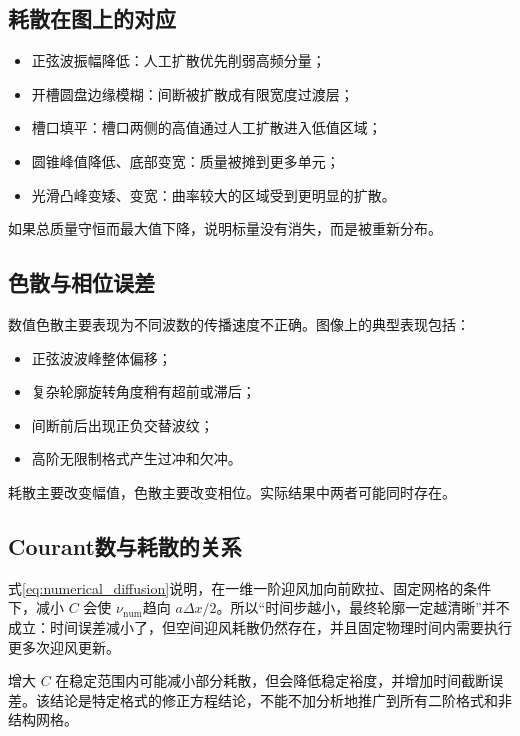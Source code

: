 \documentclass[UTF8,12pt,a4paper,fontset=fandol]{ctexart}
\numberwithin{equation}{section}
\begin{document}
\subsection{耗散在图上的对应}

\begin{itemize}
  \item 正弦波振幅降低：人工扩散优先削弱高频分量；
  \item 开槽圆盘边缘模糊：间断被扩散成有限宽度过渡层；
  \item 槽口填平：槽口两侧的高值通过人工扩散进入低值区域；
  \item 圆锥峰值降低、底部变宽：质量被摊到更多单元；
  \item 光滑凸峰变矮、变宽：曲率较大的区域受到更明显的扩散。
\end{itemize}

如果总质量守恒而最大值下降，说明标量没有消失，而是被重新分布。

\subsection{色散与相位误差}

数值色散主要表现为不同波数的传播速度不正确。图像上的典型表现包括：

\begin{itemize}
  \item 正弦波波峰整体偏移；
  \item 复杂轮廓旋转角度稍有超前或滞后；
  \item 间断前后出现正负交替波纹；
  \item 高阶无限制格式产生过冲和欠冲。
\end{itemize}

耗散主要改变幅值，色散主要改变相位。实际结果中两者可能同时存在。

\subsection{Courant数与耗散的关系}

式\eqref{eq:numerical_diffusion}说明，在一维一阶迎风加向前欧拉、固定网格的条件下，减小 $C$ 会使 $\nu_{\mathrm{num}}$趋向 $a\Delta x/2$。所以“时间步越小，最终轮廓一定越清晰”并不成立：时间误差减小了，但空间迎风耗散仍然存在，并且固定物理时间内需要执行更多次迎风更新。

增大 $C$ 在稳定范围内可能减小部分耗散，但会降低稳定裕度，并增加时间截断误差。该结论是特定格式的修正方程结论，不能不加分析地推广到所有二阶格式和非结构网格。
\end{document}
